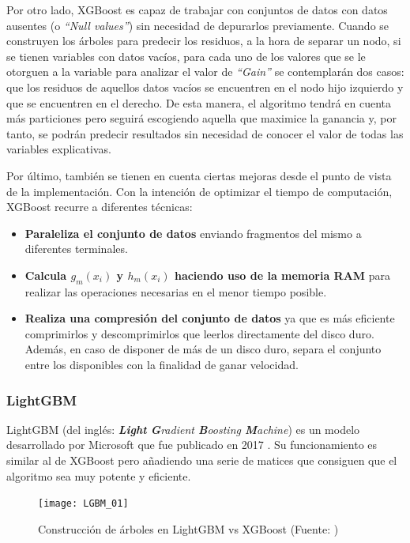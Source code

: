 \documentclass[12pt,twoside]{article}
\begin{document}
Por otro lado, XGBoost es capaz de trabajar con conjuntos de datos con datos ausentes (o \textit{``Null values''}) sin necesidad de depurarlos previamente. Cuando se construyen los árboles para predecir los residuos, a la hora de separar un nodo, si se tienen variables con datos vacíos, para cada uno de los valores que se le otorguen a la variable para analizar el valor de \textit{``Gain''} se contemplarán dos casos: que los residuos de aquellos datos vacíos se encuentren en el nodo hijo izquierdo y que se encuentren en el derecho. De esta manera, el algoritmo tendrá en cuenta más particiones pero seguirá escogiendo aquella que maximice la ganancia y, por tanto, se podrán predecir resultados sin necesidad de conocer el valor de todas las variables explicativas.

Por último, también se tienen en cuenta ciertas mejoras desde el punto de vista de la implementación. Con la intención de optimizar el tiempo de computación, XGBoost recurre a diferentes técnicas: 
\begin{itemize}
\item \textbf{Paraleliza el conjunto de datos} enviando fragmentos del mismo a diferentes terminales.

\item \textbf{Calcula $g_m(x_i)$ y $h_m(x_i)$ haciendo uso de la memoria RAM} para realizar las operaciones necesarias en el menor tiempo posible.

\item \textbf{Realiza una compresión del conjunto de datos} ya que es más eficiente comprimirlos y descomprimirlos que leerlos directamente del disco duro. Además, en caso de disponer de más de un disco duro, separa el conjunto entre los disponibles con la finalidad de ganar velocidad.
\end{itemize}



\subsubsection{LightGBM}

LightGBM (del inglés: \textit{\textbf{Light} \textbf{G}radient \textbf{B}oosting \textbf{M}achine}) es un modelo desarrollado por Microsoft que fue publicado en 2017 \cite{CH02}. Su funcionamiento es similar al de XGBoost pero añadiendo una serie de matices que consiguen que el algoritmo sea muy potente y eficiente.

\begin{figure}[h]
\centering
\texttt{[image: LGBM\_01]}
\caption{Construcción de árboles en LightGBM vs XGBoost (Fuente: \cite{MA01})}
\end{figure}
\end{document}
